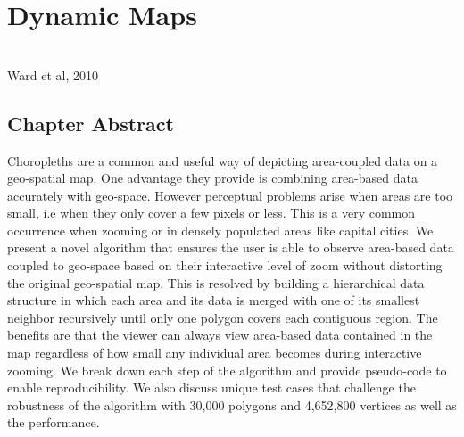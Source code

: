 \chapter{Dynamic Maps}
\label{chap:dcm}

 \cite{mcnabb2018dynamic} \\

{Ward et al, 2010}

\newpage
{\footnotesize \hypersetup{linkcolor=black}
\minitoc}

\newpage
{}
\vspace*{4cm}
\section*{Chapter Abstract}
Choropleths are a common and useful way of depicting area-coupled data on a geo-spatial map. One advantage they provide is combining area-based data accurately with geo-space. However perceptual problems arise when areas are too small, i.e when they only cover a few pixels or less. This is a very common occurrence when zooming or in densely populated areas like capital cities. We present a novel algorithm that ensures the user is able to observe area-based data coupled to geo-space based on their interactive level of zoom without distorting the original geo-spatial map. This is resolved by building a hierarchical data structure in which each area and its data is merged with one of its smallest neighbor recursively until only one polygon covers each contiguous region. The benefits are that the viewer can always view area-based data contained in the map regardless of how small any individual area becomes during interactive zooming. We break down each step of the algorithm and provide pseudo-code to enable reproducibility. We also discuss unique test cases that challenge the robustness of the algorithm with 30,000 polygons and 4,652,800 vertices as well as the performance.

\newpage

